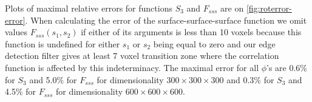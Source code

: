 \documentclass[reprint,amsmath,amssymb,aps,pre,showkeys,showpacs]{revtex4-1}
\begin{document}
Plots of maximal relative errors for functions $S_3$ and $F_{sss}$ are on
\cref{fig:roterror-error}. When calculating the error of the
surface-surface-surface function we omit values $F_{sss}(s_1, s_2)$ if either of
its arguments is less than 10 voxels because this function is undefined for
either $s_1$ or $s_2$ being equal to zero and our edge detection filter gives at
least 7 voxel transition zone where the correlation function is affected by this
indeterminacy. The maximal error for all $\phi$'s are 0.6\% for $S_3$ and 5.0\%
for $F_{sss}$ for dimensionality $300 \times 300 \times 300$ and 0.3\% for $S_3$
and 4.5\% for $F_{sss}$ for dimensionality $600 \times 600 \times 600$.


\end{document}

